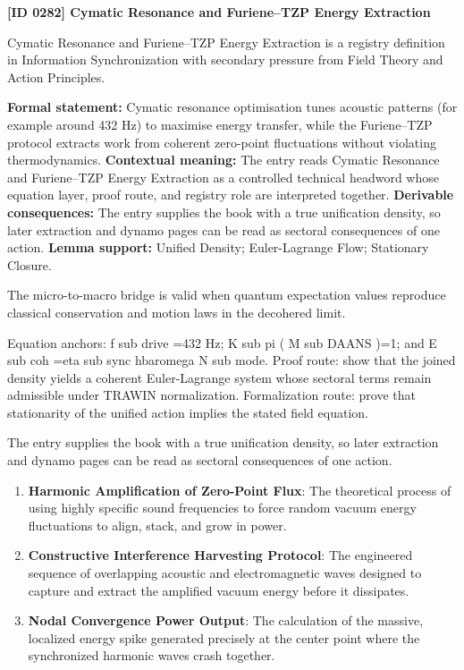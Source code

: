 \clearpage
\noindent\textbf{[ID 0282] Cymatic Resonance and Furiene--TZP Energy Extraction}\par
\vspace{0.35em}
\begingroup\small
{}
Cymatic Resonance and Furiene--TZP Energy Extraction is a registry definition in Information Synchronization with secondary pressure from Field Theory and Action Principles.

\begingroup\footnotesize\setlength{\emergencystretch}{3em}\sloppy
\textbf{Formal statement:} Cymatic resonance optimisation tunes acoustic patterns (for example around 432 Hz) to maximise energy transfer, while the Furiene--TZP protocol extracts work from coherent zero-point fluctuations without violating thermodynamics. \textbf{Contextual meaning:} The entry reads Cymatic Resonance and Furiene--TZP Energy Extraction as a controlled technical headword whose equation layer, proof route, and registry role are interpreted together. \textbf{Derivable consequences:} The entry supplies the book with a true unification density, so later extraction and dynamo pages can be read as sectoral consequences of one action. \textbf{Lemma support:} Unified Density; Euler-Lagrange Flow; Stationary Closure.\par
\endgroup

The micro-to-macro bridge is valid when quantum expectation values reproduce classical conservation and motion laws in the decohered limit.

Equation anchors: f sub drive =432 Hz; K sub pi ( M sub DAANS )=1; and E sub coh =eta sub sync hbaromega N sub mode. Proof route: show that the joined density yields a coherent Euler-Lagrange system whose sectoral terms remain admissible under TRAWIN normalization. Formalization route: prove that stationarity of the unified action implies the stated field equation.

The entry supplies the book with a true unification density, so later extraction and dynamo pages can be read as sectoral consequences of one action.
\endgroup

\begin{enumerate}[leftmargin=1.6em,itemsep=6pt,topsep=4pt]
\item \textbf{Harmonic Amplification of Zero-Point Flux}: The theoretical process of using highly specific sound frequencies to force random vacuum energy fluctuations to align, stack, and grow in power.
\item \textbf{Constructive Interference Harvesting Protocol}: The engineered sequence of overlapping acoustic and electromagnetic waves designed to capture and extract the amplified vacuum energy before it dissipates.
\item \textbf{Nodal Convergence Power Output}: The calculation of the massive, localized energy spike generated precisely at the center point where the synchronized harmonic waves crash together.
\end{enumerate}

